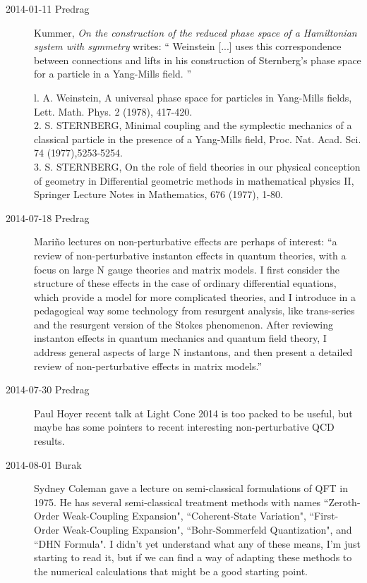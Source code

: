 \begin{description}
\item[2014-01-11 Predrag]
Kummer, {\em On the construction of the reduced phase space
of a {Hamiltonian} system with symmetry} writes:
``
Weinstein [...] uses this correspondence between connections
and lifts in his construction of Sternberg's phase space for a
particle in a Yang-Mills field.
''

l. A. Weinstein, A universal phase space for particles in Yang-Mills
fields, Lett. Math. Phys. 2 (1978), 417-420. \\
2. S. STERNBERG, Minimal coupling and the symplectic mechanics of a
classical particle in the presence of a Yang-Mills field, Proc. Nat.
Acad. Sci. 74 (1977),5253-5254. \\
3. S. STERNBERG, On the role of field theories in our physical conception
of geometry in Differential geometric methods in mathematical physics II,
Springer Lecture Notes in Mathematics,
676 (1977), 1-80. \\

\item[2014-07-18 Predrag]
Mari\~no lectures on non-perturbative effects are perhaps of
interest:
 ``a review of non-perturbative
instanton effects in quantum theories, with a focus on large N gauge
theories and matrix models. I first consider the structure of these
effects in the case of ordinary differential equations, which provide a
model for more complicated theories, and I introduce in a pedagogical way
some technology from resurgent analysis, like trans-series and the
resurgent version of the Stokes phenomenon. After reviewing instanton
effects in quantum mechanics and quantum field theory, I address general
aspects of large N instantons, and then present a detailed review of
non-perturbative effects in matrix models.''

\item[2014-07-30 Predrag]
Paul Hoyer recent talk at
{Light Cone 2014} is too packed to be useful, but maybe has some pointers
to recent interesting non-perturbative QCD results.

\item[2014-08-01 Burak]
Sydney Coleman gave a lecture on semi-classical formulations of QFT in 1975.
He has several semi-classical treatment methods with names
``Zeroth-Order Weak-Coupling Expansion",
``Coherent-State Variation",
``First-Order Weak-Coupling Expansion",
``Bohr-Sommerfeld Quantization", and
``DHN Formula". I didn't yet understand what any of these means, I'm just starting
to read it, but if we can find a way of adapting these methods to the numerical
calculations that might be a good starting point.


\end{description}
